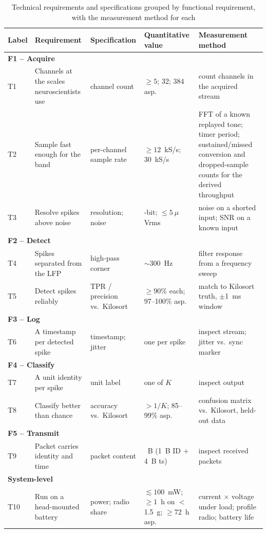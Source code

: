 \documentclass[11pt]{article}
\begin{document}
\begin{table}[H]
\centering
\caption{Technical requirements and specifications grouped by functional requirement, with the measurement method for each}
\label{tab:techreq}
{\footnotesize\sffamily
\setlength{\tabcolsep}{4pt}
\renewcommand{\arraystretch}{1.2}
\begin{tabular}{|l|>{\raggedright\arraybackslash}p{95pt}|>{\raggedright\arraybackslash}p{82pt}|>{\raggedright\arraybackslash}p{88pt}|>{\raggedright\arraybackslash}p{105pt}|}
\hline
\textbf{Label} & \textbf{Requirement} & \textbf{Specification} & \textbf{Quantitative value} & \textbf{Measurement method} \\
\hline
\multicolumn{5}{|l|}{\textbf{F1 -- Acquire}} \\
\hline
T1  & Channels at the scales neuroscientists use & channel count & $\geq 5$; 32; 384 asp. & count channels in the acquired stream \\
\hline
T2  & Sample fast enough for the band & per-channel sample rate & $\geq 12$~kS/s; 30~kS/s & FFT of a known replayed tone; timer period; sustained/missed conversion and dropped-sample counts for the derived throughput \\
\hline
T3  & Resolve spikes above noise & resolution; noise & 16-bit; $\leq 5~\mu$Vrms & noise on a shorted input; SNR on a known input \\
\hline
\multicolumn{5}{|l|}{\textbf{F2 -- Detect}} \\
\hline
T4  & Spikes separated from the LFP & high-pass corner & $\sim$300~Hz & filter response from a frequency sweep \\
\hline
T5  & Detect spikes reliably & TPR / precision vs.\ Kilosort & $\geq 90\%$ each; 97--100\% asp. & match to Kilosort truth, $\pm$1~ms window \\
\hline
\multicolumn{5}{|l|}{\textbf{F3 -- Log}} \\
\hline
T6  & A timestamp per detected spike & timestamp; jitter & one per spike & inspect stream; jitter vs.\ sync marker \\
\hline
\multicolumn{5}{|l|}{\textbf{F4 -- Classify}} \\
\hline
T7  & A unit identity per spike & unit label & one of $K$ & inspect output \\
\hline
T8  & Classify better than chance & accuracy vs.\ Kilosort & $> 1/K$; 85--99\% asp. & confusion matrix vs.\ Kilosort, held-out data \\
\hline
\multicolumn{5}{|l|}{\textbf{F5 -- Transmit}} \\
\hline
T9  & Packet carries identity and time & packet content & 5~B (1~B ID $+$ 4~B ts) & inspect received packets \\
\hline
\multicolumn{5}{|l|}{\textbf{System-level}} \\
\hline
T10 & Run on a head-mounted battery & power; radio share & $\lesssim 100$~mW; $\geq 1$~h on $<$1.5~g; $\geq$72~h asp. & current $\times$ voltage under load; profile radio; battery life \\
\hline
\end{tabular}
}
\end{table}
\end{document}
